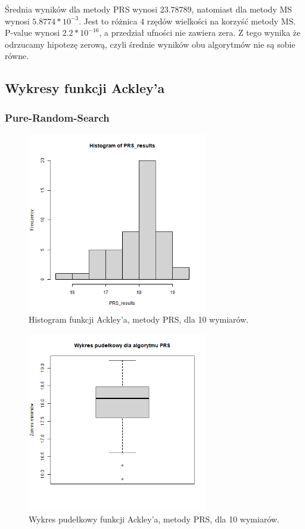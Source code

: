 \documentclass{lab}
\begin{document}
Średnia wyników dla metody PRS wynosi $23.78789$, natomiast dla metody MS wynosi $5.8774*10^{-3}$. Jest to różnica 4 rzędów wielkości na korzyść metody MS. P-value wynosi $2.2*10^{-16}$, a przedział ufności nie zawiera zera. Z tego wynika że odrzucamy hipotezę zerową, czyli średnie wyników obu algorytmów nie są sobie równe.

\subsection{Wykresy funkcji Ackley’a}
\subsubsection{Pure-Random-Search}
\begin{figure}[H]
  \centering
  \includegraphics[width=0.7\textwidth]{img/dim10_PRS_Ackley_his.png}
  \caption{Histogram funkcji Ackley'a, metody PRS, dla 10 wymiarów.}
\end{figure}
\begin{figure}[H]
  \centering
  \includegraphics[width=0.7\textwidth]{img/dim10_PRS_Ackley.png}
  \caption{Wykres pudełkowy funkcji Ackley'a, metody PRS, dla 10 wymiarów.}
\end{figure}
\end{document}
